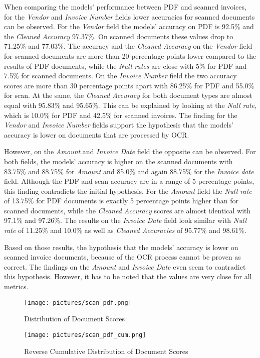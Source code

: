 When comparing the models' performance between PDF and scanned invoices, for the \textit{Vendor} and \textit{Invoice Number} fields lower accuracies for scanned documents can be observed. For the \textit{Vendor} field the models' accuracy on PDF is 92.5\% and the \textit{Cleaned Accuracy} 97.37\%. On scanned documents these values drop to 71.25\% and 77.03\%. The accuracy and the \textit{Cleaned Accuracy} on the \textit{Vendor} field for scanned documents are more than 20 percentage points lower compared to the results of PDF documents, while the \textit{Null rates} are close with 5\% for PDF and 7.5\% for scanned documents. On the \textit{Invoice Number} field the two accuracy scores are more than 30 percentage points apart with 86.25\% for PDF and 55.0\% for scan. At the same, the \textit{Cleaned Accuracy} for both document types are almost equal with 95.83\% and 95.65\%. This can be explained by looking at the \textit{Null rate}, which is 10.0\% for PDF and 42.5\% for scanned invoices. The finding for the \textit{Vendor} and \textit{Invoice Number} fields support the hypothesis that the models' accuracy is lower on documents that are processed by \ac{OCR}.

However, on the \textit{Amount} and \textit{Invoice Date} field the opposite can be observed. For both fields, the models' accuracy is higher on the scanned documents  with 83.75\% and 88.75\% for \textit{Amount} and 85.0\% and again 88.75\% for the \textit{Invoice date} field. Although the PDF and scan accuracy are in a range of 5 percentage points, this finding contradicts the initial hypothesis. For the \textit{Amount} field the \textit{Null rate} of 13.75\% for PDF documents is exactly 5 percentage points higher than for scanned documents, while the \textit{Cleaned Accuracy} scores are almost identical with 97.1\% and 97.26\%. The results on the \textit{Invoice Date} field look similar with \textit{Null rate} of 11.25\% and 10.0\% as well as \textit{Cleaned Accuracies} of 95.77\% and 98.61\%.

Based on those results, the hypothesis that the models' accuracy is lower on scanned invoice documents, because of the \ac{OCR} process cannot be proven as correct. The findings on the \textit{Amount} and \textit{Invoice Date} even seem to contradict this hypothesis. However, it has to be noted that the values are very close for all metrics.

\begin{figure}[!ht]
    \centering 
    \texttt{[image: pictures/scan\_pdf.png]}
    \caption{Distribution of Document Scores}
    \label{pic:scan_pdf_1}    %
\end{figure}
\begin{figure}[!ht]
    \centering 
    \texttt{[image: pictures/scan\_pdf\_cum.png]}
    \caption{Reverse Cumulative Distribution of Document Scores}
    \label{pic:scan_pdf_1_cum}    %
\end{figure}

